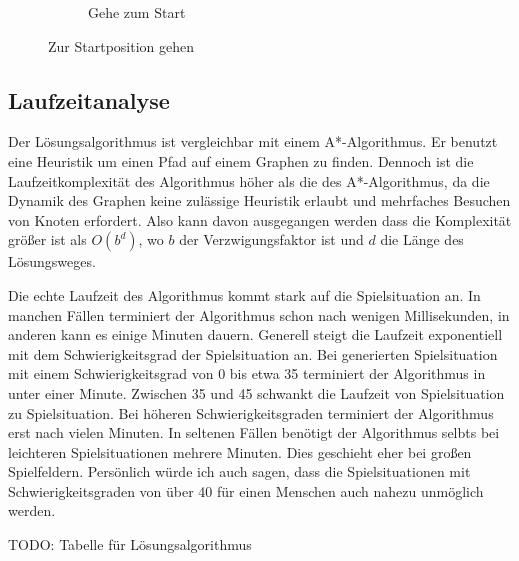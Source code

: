 \documentclass[a4paper,10pt,ngerman]{scrartcl}
\begin{document}
\begin{figure}[ht]
\begin{subfigure} {0.25\textwidth}
    \caption{Gehe zum Start}
    \label{fig:finishgenerate:goal}
  \end{subfigure}%
  \caption{Zur Startposition gehen}
  \label{fig:finishgenerate}
\end{figure}

\subsection{Laufzeitanalyse}
Der Lösungsalgorithmus ist vergleichbar mit einem A*-Algorithmus. Er benutzt eine Heuristik um einen Pfad auf einem Graphen zu finden.
Dennoch ist die Laufzeitkomplexität des Algorithmus höher als die des A*-Algorithmus,
da die Dynamik des Graphen keine zulässige Heuristik erlaubt und mehrfaches Besuchen von Knoten erfordert.
Also kann davon ausgegangen werden dass die Komplexität größer ist als $O(b^{d})$, wo $b$ der Verzwigungsfaktor ist und $d$ die Länge des Lösungsweges.

Die echte Laufzeit des Algorithmus kommt stark auf die Spielsituation an.
In manchen Fällen terminiert der Algorithmus schon nach wenigen Millisekunden, in anderen kann es einige Minuten dauern.
Generell steigt die Laufzeit exponentiell mit dem Schwierigkeitsgrad der Spielsituation an.
Bei generierten Spielsituation mit einem Schwierigkeitsgrad von 0 bis etwa 35 terminiert der Algorithmus in unter einer Minute.
Zwischen 35 und 45 schwankt die Laufzeit von Spielsituation zu Spielsituation. Bei höheren Schwierigkeitsgraden terminiert der Algorithmus erst nach vielen Minuten.
In seltenen Fällen benötigt der Algorithmus selbts bei leichteren Spielsituationen mehrere Minuten. Dies geschieht eher bei großen Spielfeldern.
Persönlich würde ich auch sagen, dass die Spielsituationen mit Schwierigkeitsgraden von über 40 für einen Menschen auch nahezu unmöglich werden.

TODO: Tabelle für Lösungsalgorithmus
\end{document}
